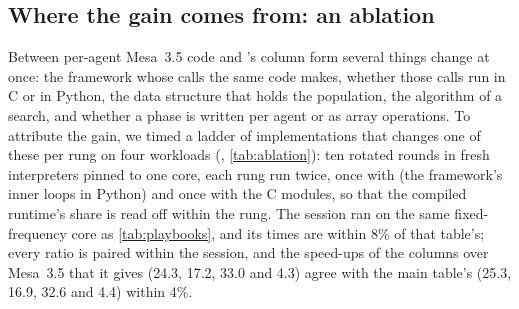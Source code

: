 \subsection{Where the gain comes from: an ablation}
\label{sec:ablation}

Between per-agent Mesa~3.5 code and \modelly{}'s column form several things change at
once: the framework whose calls the same code makes, whether those calls run in C or in
Python, the data structure that holds the population, the algorithm of a search, and
whether a phase is written per agent or as array operations. To attribute the gain, we timed
a ladder of implementations that changes one of these per rung on four workloads
(, \cref{tab:ablation}): ten rotated rounds in fresh
interpreters pinned to one core, each \modelly{} rung run twice, once with
 (the framework's inner loops in Python) and once with the C
modules, so that the compiled runtime's share is read off within the rung. The session ran
on the same fixed-frequency core as \cref{tab:playbooks}, and its times are within 8\% of
that table's; every ratio is paired within the
session, and the speed-ups of the columns over Mesa~3.5 that it gives (24.3, 17.2, 33.0
and 4.3) agree with the main table's (25.3, 16.9, 32.6 and 4.4) within 4\%.

\begin{table}[htbp]
  \centering
  \small
  \caption{The ablation: one ladder of implementations per workload, each rung changing one
  thing from the rung above. Median CPU time of the steps over ten rotated rounds with the
  framework's inner loops in Python () and compiled; the
  compiled runtime's gain within the rung (median of the per-round ratios); and the speed-up
  of the compiled rung over Mesa~3.5 and over the rung above. The Mesa~3.5 and numpy rungs
  have no Python-core arm. Generated by  from
  .}
  \label{tab:ablation}
  \setlength{\tabcolsep}{4pt}
  
\end{table}

